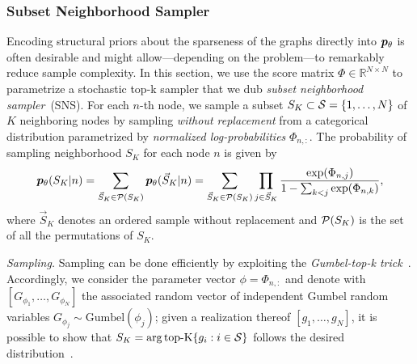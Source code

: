 \subsubsection{Subset Neighborhood Sampler}\label{s:sns}
Encoding structural priors about the sparseness of the graphs directly into ${{\bm{p}}_\theta}$ is often desirable and might allow---depending on the problem---to remarkably reduce sample complexity. In this section, we use the score matrix $\Phi\in\mathbb{R}^{N\times N}$ to parametrize a stochastic top-k sampler that we dub \emph{subset neighborhood sampler}~(SNS). 
For each $n$-th node, we sample a subset $S_K\subset \mathcal{S} = \{1,\dots,N\}$ of $K$ neighboring nodes by sampling \emph{without replacement}  from a categorical distribution parametrized by \emph{normalized log-probabilities} $\Phi_{n,:}$. 
The probability of sampling neighborhood $S_K$ for each node $n$ is given by
\begin{equation}\label{e:unord}
    {{\bm{p}}_\theta}(S_K|n)=\sum_{\vec S_K \in \mathcal{P}(S_K)}{{\bm{p}}_\theta}(\vec S_K|n) 
    =\sum_{\vec S_K \in \mathcal{P}(S_K)}\prod_{j\in\vec S_K} \frac{\exp(\Phi_{n,j})}{1-\sum_{k<j}\exp(\Phi_{n,k})},
\end{equation}
where $\vec S_K$ denotes an ordered sample without replacement and ${\mathcal{P}}{(S_K)}$ is the set of all the permutations of $S_K$. 

\textit{Sampling.}
Sampling can be done efficiently by exploiting the \emph{Gumbel-top-k trick}~\citep{kool2019stochastic}. Accordingly, we consider the parameter vector $\phi=\Phi_{n,:}$ and denote with $[G_{\phi_1},\dots,G_{\phi_N}]$ the associated random vector of independent Gumbel random variables $G_{\phi_j}\sim \text{Gumbel}({\phi_j})$; given a realization thereof $[g_1,\dots,g_N]$, it is possible to show that $S_K=\operatorname*{arg\,top-K}\{g_i:i\in \mathcal{S}\}$ follows the desired distribution~\citep{kool2019stochastic}. 


